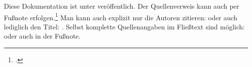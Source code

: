 Diese Dokumentation ist unter \cite{urz_vorlage_manual}
veröffentlich. Der Quellenverweis kann auch per Fußnote
erfolgen.\footcite{urz_vorlage_manual} Man kann auch explizit
nur die Autoren zitieren: \citeauthor{urz_vorlage_manual} oder
auch lediglich den Titel: .
Selbst komplette Quellenangaben im Fließtext sind möglich:
 oder auch in der
Fußnote.
